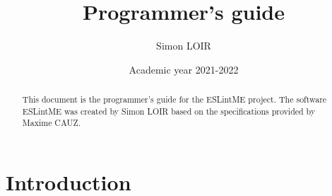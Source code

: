 \documentclass[12pt]{article}
\title{Programmer's guide}
\author{Simon LOIR}
\date{Academic year 2021-2022}
\begin{document}
\begin{titlepage}
\maketitle
\begin{abstract}
\noindent    
This document is the programmer's guide for the ESLintME project. 
The software ESLintME was created by Simon LOIR based on the specifications provided by Maxime CAUZ.
\end{abstract}
\end{titlepage}

\section{Introduction}





\end{document}
